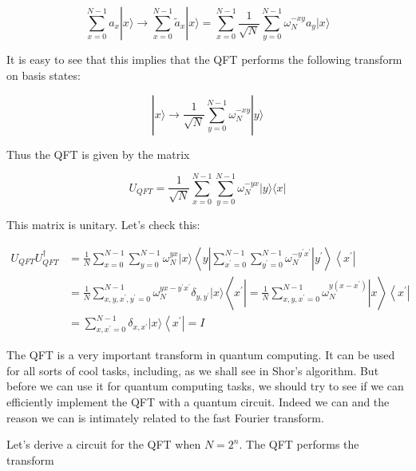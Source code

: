 \documentclass[10pt]{article}
\begin{document}
\begin{equation*}
\sum_{x=0}^{N-1} a_{x}|x\rangle \rightarrow \sum_{x=0}^{N-1} \tilde{a}_{x}|x\rangle=\sum_{x=0}^{N-1} \frac{1}{\sqrt{N}} \sum_{y=0}^{N-1} \omega_{N}^{-x y} a_{y}|x\rangle \tag{18}
\end{equation*}


It is easy to see that this implies that the QFT performs the following transform on basis states:


\begin{equation*}
|x\rangle \rightarrow \frac{1}{\sqrt{N}} \sum_{y=0}^{N-1} \omega_{N}^{-x y}|y\rangle \tag{19}
\end{equation*}


Thus the QFT is given by the matrix


\begin{equation*}
U_{Q F T}=\frac{1}{\sqrt{N}} \sum_{x=0}^{N-1} \sum_{y=0}^{N-1} \omega_{N}^{-y x}|y\rangle\langle x| \tag{20}
\end{equation*}


This matrix is unitary. Let's check this:


\begin{align*}
U_{Q F T} U_{Q F T}^{\dagger} & =\frac{1}{N} \sum_{x=0}^{N-1} \sum_{y=0}^{N-1} \omega_{N}^{y x}|x\rangle\left\langle y\left|\sum_{x^{\prime}=0}^{N-1} \sum_{y^{\prime}=0}^{N-1} \omega_{N}^{-y^{\prime} x^{\prime}}\right| y^{\prime}\right\rangle\left\langle x^{\prime}\right| \\
& =\frac{1}{N} \sum_{x, y, x^{\prime}, y^{\prime}=0}^{N-1} \omega_{N}^{y x-y^{\prime} x^{\prime}} \delta_{y, y^{\prime}}|x\rangle\left\langle x^{\prime}\left|=\frac{1}{N} \sum_{x, y, x^{\prime}=0}^{N-1} \omega_{N}^{y\left(x-x^{\prime}\right)}\right| x\right\rangle\left\langle x^{\prime}\right| \\
& =\sum_{x, x^{\prime}=0}^{N-1} \delta_{x, x^{\prime}}|x\rangle\left\langle x^{\prime}\right|=I \tag{21}
\end{align*}


The QFT is a very important transform in quantum computing. It can be used for all sorts of cool tasks, including, as we shall see in Shor's algorithm. But before we can use it for quantum computing tasks, we should try to see if we can efficiently implement the QFT with a quantum circuit. Indeed we can and the reason we can is intimately related to the fast Fourier transform.

Let's derive a circuit for the QFT when $N=2^{n}$. The QFT performs the transform
\end{document}
